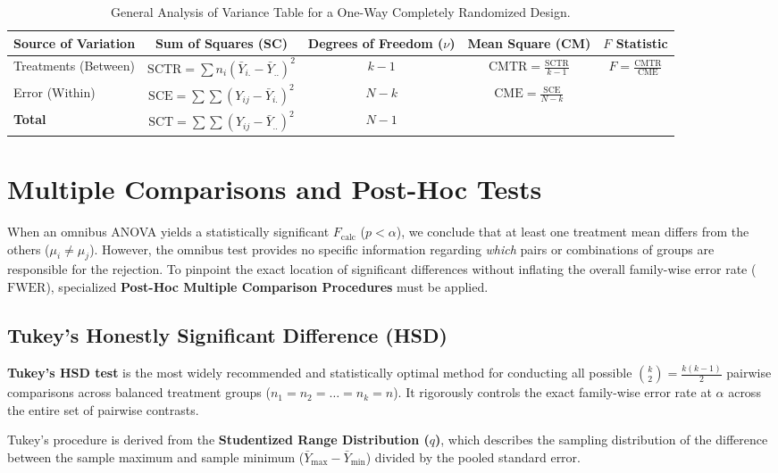 \begin{table}[h!]
	\centering
	\begin{tabular}{lcccc}
		\hline
		\textbf{Source of Variation} & \textbf{Sum of Squares (SC)} & \textbf{Degrees of Freedom ($\nu$)} & \textbf{Mean Square (CM)} & \textbf{$F$ Statistic} \\ \hline
		Treatments (Between) & $\text{SCTR} = \sum n_i(\bar{Y}_{i.} - \bar{Y}_{..})^2$ & $k - 1$ & $\text{CMTR} = \frac{\text{SCTR}}{k-1}$ & $F = \frac{\text{CMTR}}{\text{CME}}$ \\
		Error (Within) & $\text{SCE} = \sum \sum (Y_{ij} - \bar{Y}_{i.})^2$ & $N - k$ & $\text{CME} = \frac{\text{SCE}}{N-k}$ & \\ \hline
		\textbf{Total} & $\text{SCT} = \sum \sum (Y_{ij} - \bar{Y}_{..})^2$ & $N - 1$ & & \\ \hline
	\end{tabular}
	\caption{General Analysis of Variance Table for a One-Way Completely Randomized Design.}
	\label{tab:anova_unifactorial}
\end{table}

\section{Multiple Comparisons and Post-Hoc Tests}

When an omnibus ANOVA yields a statistically significant $F_{\text{calc}}$ ($p < \alpha$), we conclude that at least one treatment mean differs from the others ($\mu_i \neq \mu_j$). However, the omnibus test provides no specific information regarding \emph{which} pairs or combinations of groups are responsible for the rejection. To pinpoint the exact location of significant differences without inflating the overall family-wise error rate ($\text{FWER}$), specialized \textbf{Post-Hoc Multiple Comparison Procedures} must be applied.

\subsection{Tukey's Honestly Significant Difference (HSD)}
\textbf{Tukey's HSD test} is the most widely recommended and statistically optimal method for conducting all possible $\binom{k}{2} = \frac{k(k-1)}{2}$ pairwise comparisons across balanced treatment groups ($n_1 = n_2 = \dots = n_k = n$). It rigorously controls the exact family-wise error rate at $\alpha$ across the entire set of pairwise contrasts.

Tukey's procedure is derived from the \textbf{Studentized Range Distribution ($q$)}, which describes the sampling distribution of the difference between the sample maximum and sample minimum ($\bar{Y}_{\text{max}} - \bar{Y}_{\text{min}}$) divided by the pooled standard error.

